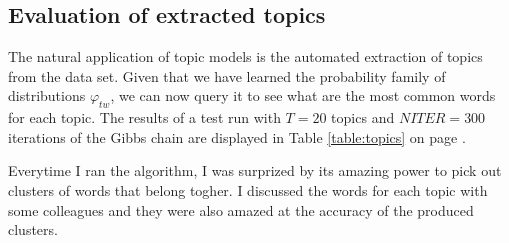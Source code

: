 \documentclass[11pt]{article}
\begin{document}
    \subsection{Evaluation of extracted topics}

        The natural application of topic models is the automated extraction of topics from
        the data set.
        Given that we have learned the probability family of distributions $\varphi_{tw}$,
        we can now query it to see what are the most common words for each topic.
        The results of a test run with $T=20$ topics and $NITER=300$ iterations of the Gibbs chain
        are displayed in Table \ref{table:topics} on page \pageref{table:topics}.

        Everytime I ran the algorithm, I was surprized by its amazing power to pick out clusters
        of words that belong togher. 
        I discussed the words for each topic with some colleagues and they were also amazed at
        the accuracy of the produced clusters.
	
\end{document}
